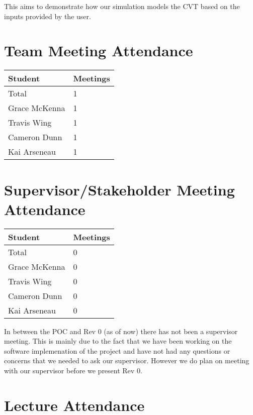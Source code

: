 \documentclass{article}
\begin{document}
This aims to demonstrate how our simulation models the CVT based on the inputs provided by the user.

\section{Team Meeting Attendance}



\begin{table}[H]
\centering
\begin{tabular}{ll}
\toprule
\textbf{Student} & \textbf{Meetings}\\
\midrule
Total & 1\\
Grace McKenna & 1\\
Travis Wing & 1\\
Cameron Dunn & 1\\
Kai Arseneau & 1\\
\bottomrule
\end{tabular}
\end{table}


\section{Supervisor/Stakeholder Meeting Attendance}

\begin{table}[H]
\centering
\begin{tabular}{ll}
\toprule
\textbf{Student} & \textbf{Meetings}\\
\midrule
Total & 0\\
Grace McKenna & 0\\
Travis Wing & 0\\
Cameron Dunn & 0\\
Kai Arseneau & 0\\
\bottomrule
\end{tabular}
\end{table}

In between the POC and Rev 0 (as of now) there has not been a supervisor meeting. This is mainly due to the fact
that we have been working on the software implemenation of the project and have not had any questions or concerns that we needed to ask our supervisor.
However we do plan on meeting with our supervisor before we present Rev 0.


\section{Lecture Attendance}
\end{document}
